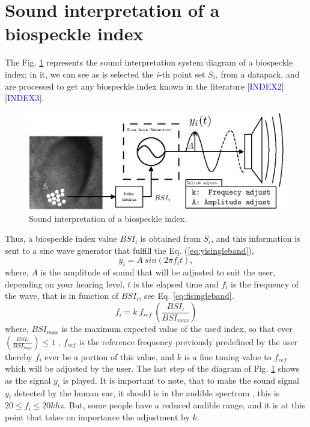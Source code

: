 \documentclass[review]{elsarticle}
\begin{document}
\section{Sound interpretation of a biospeckle index}
\label{sec:soundsingleband}
The Fig. \ref{fig:Diagrama0} represents the sound interpretation system diagram of a
biospeckle index; in it, we can see as is selected the $i$-th point set $S_i$, from a datapack,
and are processed to get any  biospeckle index known in the literature \cite{avd} \textcolor{blue}{[INDEX2] [INDEX3]}.
\begin{figure}[ht!]
\centering
\includegraphics[width=0.99\columnwidth]{Diagrama0.eps}
\caption{Sound interpretation of a biospeckle index.}
\label{fig:Diagrama0}
\end{figure}
Thus, a biospeckle index value $BSI_i$ is obtained from $S_i$, and this information is sent to a sine wave generator
that fulfill the Eq. (\ref{eq:yisingleband}), 
\begin{equation}\label{eq:yisingleband}
 y_i= A~sin \left( 2 \pi f_i t \right),
\end{equation}
where, $A$ is the amplitude of sound that will be adjusted to suit the user, depending on your hearing level, 
$t$ is the elapsed time
and $f_i$ is the frequency of the wave, that is in function of $BSI_i$, see Eq. \ref{eq:fisingleband}.
\begin{equation}\label{eq:fisingleband}
 f_i= k~f_{ref}~\left( \frac{BSI_i}{BSI_{max}} \right)  
\end{equation}
where, $BSI_{max}$ is the maximum expected value of the used index, so that 
ever $\left( \frac{BSI_i}{BSI_{max}} \right) \leq 1$ , $f_{ref}$ is 
the reference frequency previously predefined by the user thereby $f_i$ ever be a portion 
of this value, and $k$ is a fine tuning value to $f_{ref}$ which will be
adjusted by the user. The last step of the diagram of Fig. \ref{fig:Diagrama0} shows
as the signal $y_i$ is played.
It is important to note, that to make the sound signal $y_i$ detected by the human ear, it should is in the 
audible spectrum \cite{humanrange}, this is $20 \leq f_i \leq 20khz $. But, some people
have a reduced audible range, and it is at this point that takes on 
importance the adjustment by $k$.
\end{document}
